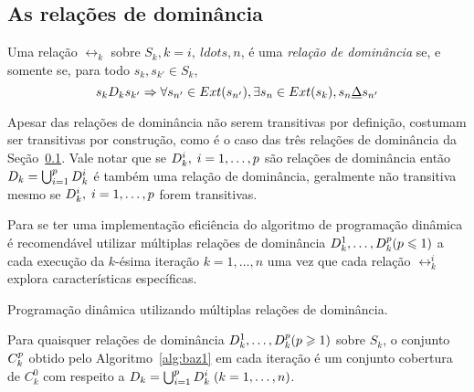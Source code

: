 \subsection{As relações de dominância}
\label{sec:domrel}


\begin{mydef}
Uma relação $\rel_k$ sobre $S_k, k = i,\ ldots, n$, é uma \emph{relação de dominância}
se, e somente se, para todo $s_k, s_{k'} \in S_k$,
\begin{equation}
  s_k D_k s_{{k'}} \Rightarrow \forall s_{{n'}} \in Ext(s_{{n'}}),
    \exists s_n \in Ext(s_k), s_n \underline{\Delta} s_{{n'}}
  \label{eq:domrel}
\end{equation}
\label{def:domrel}
\end{mydef}

Apesar das relações de dominância não serem transitivas por definição,
costumam ser transitivas por construção, como é o caso
das três relações de dominância da Seção~\ref{sec:domrel}.
Vale notar que se $D_k^i, \; i = 1, \ldots, p$ são relações de dominância
então $D_k = \bigcup^{p}_{i = 1} D_k^i$ é também uma relação
de dominância, geralmente não transitiva mesmo se $D_k^i, \; i = 1, \ldots, p$
forem transitivas.

Para se ter uma implementação eficiência do algoritmo de programação dinâmica
é recomendável utilizar múltiplas relações de dominância
$D_k^1, \ldots, D_k^p (p \leqslant 1)$ a cada execução da $k$-ésima iteração
$k = 1, \ldots, n$ uma vez que cada relação $\rel_k^i$ explora características
específicas.

\begin{algorithm}
  \caption{Programação dinâmica utilizando múltiplas relações de dominância.}
  \label{alg:baz1}
  
\end{algorithm}

\begin{myprop}
  Para quaisquer relações de dominância $D_k^1, \ldots, D_k^p (p \geqslant 1)$
  sobre $S_k$, o conjunto $C_k^p$ obtido pelo Algoritmo~\ref{alg:baz1}
  em cada iteração é um conjunto cobertura de $C_k^0$ com respeito a
  $D_k = \bigcup_{i=1}^p D_k^i \; (k = 1, \ldots, n)$.
  \label{prop:coverset}
\end{myprop}

